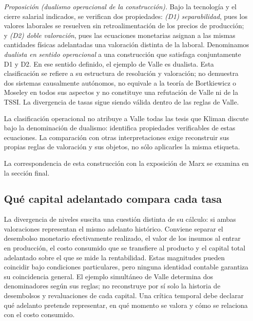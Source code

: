 \documentclass[10pt,twoside]{article}
\begin{document}
\noindent\textit{Proposición (dualismo operacional de la construcción).} Bajo la tecnología y el cierre salarial indicados, se verifican dos propiedades: \emph{(D1) separabilidad}, pues los valores laborales se resuelven sin retroalimentación de los precios de producción; y \emph{(D2) doble valoración}, pues las ecuaciones monetarias asignan a las mismas cantidades físicas adelantadas una valoración distinta de la laboral. Denominamos \emph{dualista en sentido operacional} a una construcción que satisfaga conjuntamente D1 y D2. En ese sentido definido, el ejemplo de Valle es dualista. Esta clasificación se refiere a su estructura de resolución y valoración; no demuestra dos sistemas causalmente autónomos, no equivale a la teoría de Bortkiewicz o Moseley en todos sus aspectos y no constituye una refutación de Valle ni de la TSSI. La divergencia de tasas sigue siendo válida dentro de las reglas de Valle.

La clasificación operacional no atribuye a Valle todas las tesis que Kliman discute bajo la denominación de dualismo: identifica propiedades verificables de estas ecuaciones. La comparación con otras interpretaciones exige reconstruir sus propias reglas de valoración y sus objetos, no sólo aplicarles la misma etiqueta.

La correspondencia de esta construcción con la exposición de Marx se examina en la sección final.



\subsection*{Qué capital adelantado compara cada tasa}
La divergencia de niveles suscita una cuestión distinta de su cálculo: si ambas valoraciones representan el mismo adelanto histórico. Conviene separar el desembolso monetario efectivamente realizado, el valor de los insumos al entrar en producción, el costo consumido que se transfiere al producto y el capital total adelantado sobre el que se mide la rentabilidad. Estas magnitudes pueden coincidir bajo condiciones particulares, pero ninguna identidad contable garantiza su coincidencia general. El ejemplo simultáneo de Valle determina dos denominadores según sus reglas; no reconstruye por sí solo la historia de desembolsos y revaluaciones de cada capital. Una crítica temporal debe declarar qué adelanto pretende representar, en qué momento se valora y cómo se relaciona con el costo consumido.
\end{document}
